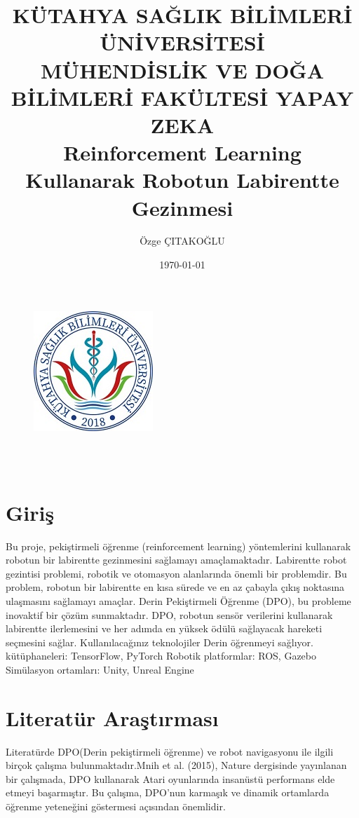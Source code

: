 \documentclass[12pt, a4paper]{article}
\title{\bf\fontsize{12pt}{14pt}\selectfont KÜTAHYA SAĞLIK BİLİMLERİ ÜNİVERSİTESİ\\MÜHENDİSLİK VE DOĞA BİLİMLERİ FAKÜLTESİ }
\begin{document}
	\maketitle
	\begin{figure}[h]
		\centering
		\includegraphics{logo}\\ \
		
		 \author{Özge ÇITAKOĞLU} \\
		\date{\today} 
	\end{figure}  
	\begin{center}
		\title{\bf\fontsize{12pt}{14pt}\selectfont YAPAY ZEKA \\
			Reinforcement Learning Kullanarak Robotun Labirentte Gezinmesi  }
	\end{center}
		
	
	\section{Giriş}
	
Bu proje, pekiştirmeli öğrenme (reinforcement learning) yöntemlerini kullanarak robotun bir labirentte gezinmesini sağlamayı amaçlamaktadır. Labirentte robot gezintisi problemi, robotik ve otomasyon alanlarında önemli bir problemdir. Bu problem, robotun bir labirentte en kısa sürede ve en az çabayla çıkış noktasına ulaşmasını sağlamayı amaçlar. Derin Pekiştirmeli Öğrenme (DPO), bu probleme inovaktif bir çözüm sunmaktadır. DPO, robotun sensör verilerini kullanarak labirentte ilerlemesini ve her adımda en yüksek ödülü sağlayacak hareketi seçmesini sağlar. Kullanılacağınız teknolojiler Derin öğrenmeyi sağlıyor. kütüphaneleri: TensorFlow, PyTorch Robotik platformlar: ROS, Gazebo Simülasyon ortamları: Unity, Unreal Engine

	
	\section{Literatür Araştırması}	
	
Literatürde DPO(Derin pekiştirmeli öğrenme) ve robot navigasyonu ile ilgili birçok çalışma bulunmaktadır.Mnih et al. (2015), Nature dergisinde yayınlanan bir çalışmada, DPO kullanarak Atari oyunlarında insanüstü performans elde etmeyi başarmıştır. Bu çalışma, DPO'nun karmaşık ve dinamik ortamlarda öğrenme yeteneğini göstermesi açısından önemlidir.
\end{document}
